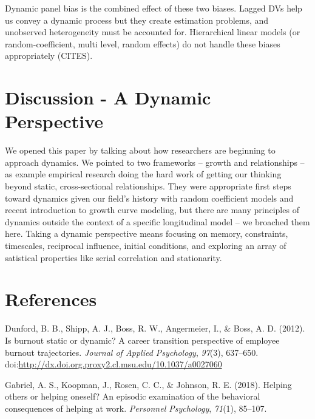 \documentclass[english,,man]{apa6}
\theoremstyle{definition}
\theoremstyle{definition}
\theoremstyle{definition}
\theoremstyle{remark}
\begin{document}
Dynamic panel bias is the combined effect of these two biases. Lagged
DVs help us convey a dynamic process but they create estimation
problems, and unobserved heterogeneity must be accounted for.
Hierarchical linear models (or random-coefficient, multi level, random
effects) do not handle these biases appropriately (CITES).

\hypertarget{discussion---a-dynamic-perspective}{%
\section{Discussion - A Dynamic
Perspective}\label{discussion---a-dynamic-perspective}}

We opened this paper by talking about how researchers are beginning to
approach dynamics. We pointed to two frameworks -- growth and
relationships -- as example empirical research doing the hard work of
getting our thinking beyond static, cross-sectional relationships. They
were appropriate first steps toward dynamics given our field's history
with random coefficient models and recent introduction to growth curve
modeling, but there are many principles of dynamics outside the context
of a specific longitudinal model -- we broached them here. Taking a
dynamic perspective means focusing on memory, constraints, timescales,
reciprocal influence, initial conditions, and exploring an array of
satistical properties like serial correlation and stationarity.

\newpage

\hypertarget{references}{%
\section{References}\label{references}}

\setlength{\parindent}{-0.5in}
\setlength{\leftskip}{0.5in}

\hypertarget{refs}{}
\leavevmode\hypertarget{ref-dunford_is_2012}{}%
Dunford, B. B., Shipp, A. J., Boss, R. W., Angermeier, I., \& Boss, A.
D. (2012). Is burnout static or dynamic? A career transition perspective
of employee burnout trajectories. \emph{Journal of Applied Psychology},
\emph{97}(3), 637--650.
doi:\href{https://doi.org/http://dx.doi.org.proxy2.cl.msu.edu/10.1037/a0027060}{http://dx.doi.org.proxy2.cl.msu.edu/10.1037/a0027060}

\leavevmode\hypertarget{ref-gabriel_helping_2018}{}%
Gabriel, A. S., Koopman, J., Rosen, C. C., \& Johnson, R. E. (2018).
Helping others or helping oneself? An episodic examination of the
behavioral consequences of helping at work. \emph{Personnel Psychology},
\emph{71}(1), 85--107.
\end{document}

